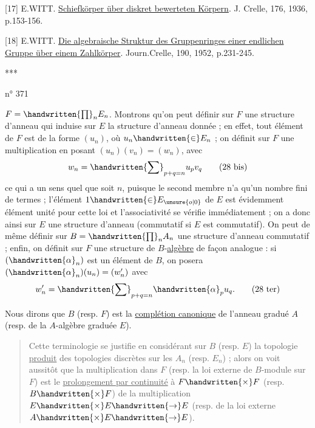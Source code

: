 [17] E.WITT. \uline{Schiefkörper über diskret bewerteten Körpern}. J. Crelle, 176, 1936, p.153-156.

[18] E.WITT. \uline{Die algebraische Struktur des Gruppenringes einer endlichen Gruppe über einem Zahlkörper}. Journ.Crelle, 190, 1952, p.231-245.

\begin{center}***\end{center}

\begin{flushright}n° 371\end{flushright}

$F=\handwritten{\prod}_{n}E_n$. Montrons qu'on peut définir sur $F$ une structure d'anneau qui induise sur $E$ la structure d'anneau donnée ; en effet, tout élément de $F$ est de la forme $(u_n)$, où $u_n\handwritten{\in}E_n$ ; on définit sur $F$ une multiplication en posant $(u_n)(v_n)=(w_n)$, avec
\[
w_n=\handwritten{\sum}_{p+q=n}u_pv_q
\tag*{(28 bis)}
\]
ce qui a un sens quel que soit $n$, puisque le second membre n'a qu'un nombre fini de termes ; l'élément $1\handwritten{\in}E_{\unsure{o|0}}$ de $E$ est évidemment élément unité pour cette loi et l'associativité se vérifie immédiatement ; on a donc ainsi sur $E$ une structure d'anneau (commutatif si $E$ est commutatif). On peut de même définir sur $B=\handwritten{\prod}_{n}A_n$ une structure d'anneau commutatif ; enfin, on définit sur $F$ une structure de $B$-\uline{algèbre} de façon analogue : si $(\handwritten{\alpha}_n)$ est un élément de $B$, on posera $(\handwritten{\alpha}_n)(u_n)=(w'_n)$ avec
\[
w'_n=\handwritten{\sum}_{p+q=n}\handwritten{\alpha}_pu_q.
\tag*{(28 ter)}
\]

Nous dirons que $B$ (resp. $F$) est la \uline{complétion canonique} de l'anneau gradué $A$ (resp. de la $A$-algèbre graduée $E$).

\begin{quote}
\handwritten{*}Cette terminologie se justifie en considérant sur $B$ (resp. $E$) la topologie \uline{produit} des topologies discrètes sur les $A_n$ (resp. $E_n$) ; alors on voit aussitôt que la multiplication dans $F$ (resp. la loi externe de $B$-module sur $F$) est le \uline{prolongement par continuité} à $F\handwritten{\times}F$ (resp. $B\handwritten{\times}F$) de la multiplication $E\handwritten{\times}E\handwritten{\to}E$ (resp. de la loi externe $A\handwritten{\times}E\handwritten{\to}E$).\handwritten{*}
\end{quote}

